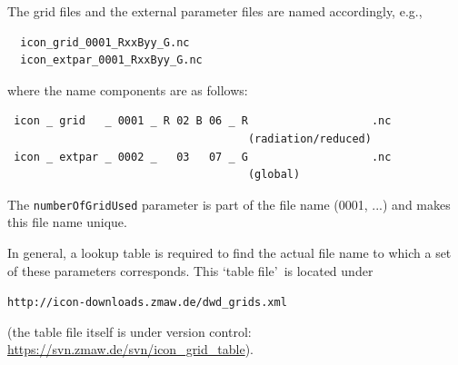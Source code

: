 The grid files and the external parameter files are named accordingly, e.g.,
\begin{small}
 \begin{verbatim}
  icon_grid_0001_RxxByy_G.nc
  icon_extpar_0001_RxxByy_G.nc 
 \end{verbatim}
\end{small}
where the name components are as follows:
\begin{small}
 \begin{verbatim}
 icon _	grid   _ 0001 _	R 02 B 06 _	R                   .nc 
                                     (radiation/reduced)
 icon _ extpar _ 0002 _	  03   07 _	G                   .nc
                                     (global)         
 \end{verbatim}
\end{small}

The \verb+numberOfGridUsed+ parameter is part of the file name (0001, ...) and makes this file name unique.

In general, a lookup table is required to find the actual file name to which a set of these parameters corresponds. 
This \lq table file\rq\ is located under 
\begin{center}
  {\tt http://icon-downloads.zmaw.de/dwd\_grids.xml} 
\end{center}
(the table file itself is under version control: \href{https://svn.zmaw.de/svn/icon\_grid\_table}{https://svn.zmaw.de/svn/icon\_grid\_table}). 



